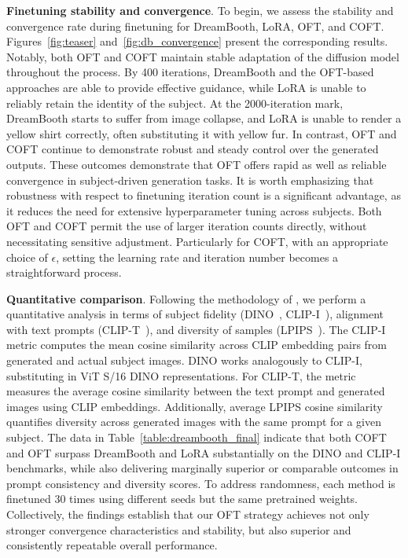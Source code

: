 \textbf{Finetuning stability and convergence}. To begin, we assess the stability and convergence rate during finetuning for DreamBooth, LoRA, OFT, and COFT. Figures~\ref{fig:teaser} and~\ref{fig:db_convergence} present the corresponding results. Notably, both OFT and COFT maintain stable adaptation of the diffusion model throughout the process. By 400 iterations, DreamBooth and the OFT-based approaches are able to provide effective guidance, while LoRA is unable to reliably retain the identity of the subject. At the 2000-iteration mark, DreamBooth starts to suffer from image collapse, and LoRA is unable to render a yellow shirt correctly, often substituting it with yellow fur. In contrast, OFT and COFT continue to demonstrate robust and steady control over the generated outputs. These outcomes demonstrate that OFT offers rapid as well as reliable convergence in subject-driven generation tasks. It is worth emphasizing that robustness with respect to finetuning iteration count is a significant advantage, as it reduces the need for extensive hyperparameter tuning across subjects. Both OFT and COFT permit the use of larger iteration counts directly, without necessitating sensitive adjustment. Particularly for COFT, with an appropriate choice of $\epsilon$, setting the learning rate and iteration number becomes a straightforward process.

\textbf{Quantitative comparison}. Following the methodology of \cite{ruiz2023dreambooth}, we perform a quantitative analysis in terms of subject fidelity (DINO~\cite{caron2021emerging}, CLIP-I~\cite{radford2021learning}), alignment with text prompts (CLIP-T~\cite{radford2021learning}), and diversity of samples (LPIPS~\cite{zhang2018unreasonable}). The CLIP-I metric computes the mean cosine similarity across CLIP embedding pairs from generated and actual subject images. DINO works analogously to CLIP-I, substituting in ViT S/16 DINO representations. For CLIP-T, the metric measures the average cosine similarity between the text prompt and generated images using CLIP embeddings. Additionally, average LPIPS cosine similarity quantifies diversity across generated images with the same prompt for a given subject. The data in Table~\ref{table:dreambooth_final} indicate that both COFT and OFT surpass DreamBooth and LoRA substantially on the DINO and CLIP-I benchmarks, while also delivering marginally superior or comparable outcomes in prompt consistency and diversity scores. To address randomness, each method is finetuned 30 times using different seeds but the same pretrained weights. Collectively, the findings establish that our OFT strategy achieves not only stronger convergence characteristics and stability, but also superior and consistently repeatable overall performance.

